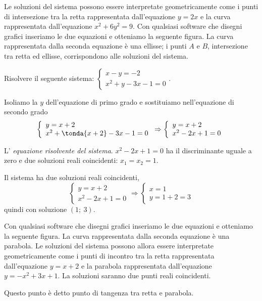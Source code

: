 \begin{esempio}
\begin{multicols}{2}
Le soluzioni del sistema possono essere interpretate geometricamente come i 
punti di intersezione tra la retta rappresentata dall'equazione \(y=2x\) e la 
curva rappresentata dall'equazione \(x^2+6y^2=9\). Con qualsiasi software che 
disegni grafici inseriamo le due equazioni e otteniamo la seguente figura.
La curva rappresentata dalla seconda equazione è una ellisse; 
i punti \(A\) e \(B\), intersezione tra retta ed ellisse, corrispondono alle 
soluzioni del sistema.
\begin{center}

\end{center}
 \end{multicols}
\end{esempio}

\begin{esempio}
Risolvere il seguente sistema: \(\left\{\begin{array}{l}x-y=-2 
\\x^2+y-3x-1=0\end{array}\right..\)

Isoliamo la \(y\) dell'equazione di primo grado e sostituiamo nell'equazione di 
secondo grado 
\[\left\{\begin{array}{l}y=x+2 \\
x^2+\tonda{x+2}-3x-1=0\end{array}\right. 
\Rightarrow\left\{\begin{array}{l}y=x+2 \\
x^2-2x+1=0\end{array}\right.\]

L' \emph{equazione risolvente del sistema}. \(x^2-2x+1=0\) ha il discriminante 
uguale a zero e due soluzioni reali coincidenti: \(x_1=x_2=1\).

Il sistema ha due soluzioni reali coincidenti, 
\[\left\{\begin{array}{l}y=x+2 \\x^2-2x+1=0\end{array}\right. 
\Rightarrow\left\{\begin{array}{l}x=1 \\
y=1+2=3\end{array}\right.\] 
quindi con soluzione \((1;~3)\).

{Con qualsiasi software che disegni grafici inseriamo le due equazioni e 
otteniamo la seguente figura.
La curva rappresentata dalla seconda equazione è una parabola. Le soluzioni 
del sistema possono allora essere interpretate geometricamente come i punti 
di incontro tra la retta rappresentata dall'equazione \(y=x+2\) e la parabola 
rappresentata dall'equazione \(y=-x^2+3x+1\). La soluzioni saranno due punti 
reali coincidenti. 

Questo punto è detto punto di tangenza tra retta e parabola.}
{\begin{center}
\scalebox{0.9}{}
\end{center}}

\end{esempio}

